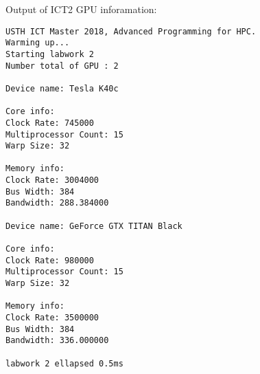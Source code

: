 \documentclass{article}
\begin{document}
Output of ICT2 GPU inforamation:
\begin{verbatim}
USTH ICT Master 2018, Advanced Programming for HPC.
Warming up...
Starting labwork 2
Number total of GPU : 2

Device name: Tesla K40c

Core info:
Clock Rate: 745000
Multiprocessor Count: 15
Warp Size: 32

Memory info:
Clock Rate: 3004000
Bus Width: 384
Bandwidth: 288.384000

Device name: GeForce GTX TITAN Black

Core info:
Clock Rate: 980000
Multiprocessor Count: 15
Warp Size: 32

Memory info:
Clock Rate: 3500000
Bus Width: 384
Bandwidth: 336.000000

labwork 2 ellapsed 0.5ms
\end{verbatim}
\end{document}

